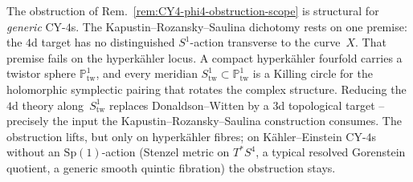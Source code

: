\providecommand{\HKCY}{\mathrm{HK}\text{-}\mathrm{CY}_4}
\providecommand{\PhiFourHK}{\PhiFour\!\mid_{\HKCY}}
\providecommand{\twS}{\mathbb P^1_{\mathrm{tw}}}
\providecommand{\Stwist}{S^1_{\mathrm{tw}}}
\providecommand{\VolKoneK}{\mathrm{Vol}(\mathrm{K3}_1)\,\mathrm{Vol}(\mathrm{K3}_2)}
\providecommand{\Mmac}{\mathsf M}

The obstruction of Rem.~\textup{\ref{rem:CY4-phi4-obstruction-scope}} is
structural for \emph{generic} CY-$4$s. The Kapustin--Rozansky--Saulina
dichotomy rests on one premise: the $4$d target has no distinguished
$S^1$-action transverse to the curve~$X$. That premise fails on the
hyperk\"ahler locus. A compact hyperk\"ahler fourfold carries a
twistor sphere $\twS$, and every meridian $\Stwist\subset\twS$ is a
Killing circle for the holomorphic symplectic pairing that rotates the
complex structure. Reducing the $4$d theory along~$\Stwist$ replaces
Donaldson--Witten by a $3$d topological target -- precisely the input
the Kapustin--Rozansky--Saulina construction consumes. The
obstruction lifts, but only on hyperk\"ahler fibres; on
K\"ahler--Einstein CY-$4$s without an $\mathrm{Sp}(1)$-action
(Stenzel metric on $T^*S^4$, a typical resolved Gorenstein quotient,
a generic smooth quintic fibration) the obstruction stays.

